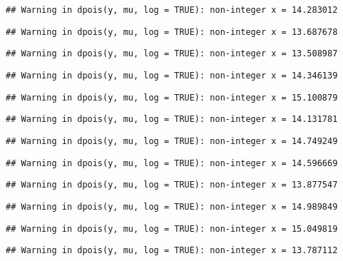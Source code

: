 \documentclass[
]{article}
\begin{document}
\begin{verbatim}
## Warning in dpois(y, mu, log = TRUE): non-integer x = 14.283012
\end{verbatim}

\begin{verbatim}
## Warning in dpois(y, mu, log = TRUE): non-integer x = 13.687678
\end{verbatim}

\begin{verbatim}
## Warning in dpois(y, mu, log = TRUE): non-integer x = 13.508987
\end{verbatim}

\begin{verbatim}
## Warning in dpois(y, mu, log = TRUE): non-integer x = 14.346139
\end{verbatim}

\begin{verbatim}
## Warning in dpois(y, mu, log = TRUE): non-integer x = 15.100879
\end{verbatim}

\begin{verbatim}
## Warning in dpois(y, mu, log = TRUE): non-integer x = 14.131781
\end{verbatim}

\begin{verbatim}
## Warning in dpois(y, mu, log = TRUE): non-integer x = 14.749249
\end{verbatim}

\begin{verbatim}
## Warning in dpois(y, mu, log = TRUE): non-integer x = 14.596669
\end{verbatim}

\begin{verbatim}
## Warning in dpois(y, mu, log = TRUE): non-integer x = 13.877547
\end{verbatim}

\begin{verbatim}
## Warning in dpois(y, mu, log = TRUE): non-integer x = 14.989849
\end{verbatim}

\begin{verbatim}
## Warning in dpois(y, mu, log = TRUE): non-integer x = 15.049819
\end{verbatim}

\begin{verbatim}
## Warning in dpois(y, mu, log = TRUE): non-integer x = 13.787112
\end{verbatim}
\end{document}
